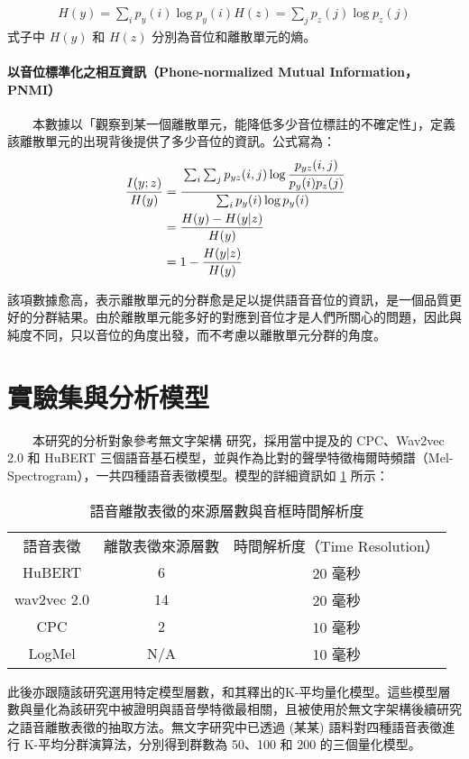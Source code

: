     \begin{align}
        H(y) = \sum_i{p_y(i)\log p_y(i)}
        H(z) = \sum_j{p_z(j)\log p_z(j)}
    \end{align}
式子中 $H(y)$ 和 $H(z)$ 分別為音位和離散單元的熵。

\paragraph{以音位標準化之相互資訊（Phone-normalized Mutual Information，PNMI）}

　　本數據以「觀察到某一個離散單元，能降低多少音位標註的不確定性」，定義該離散單元的出現背後提供了多少音位的資訊。公式寫為：
    \begin{align}
        \frac{I(y;z)}{H(y)}&=\cfrac{\sum_i \sum_j p_{yz}(i, j) \log \cfrac{p_{yz}(i, j)}{p_y(i)p_z(j)}}{\sum_i p_y(i) \log p_y(i)} \\
        &=\frac{H(y)-H(y|z)}{H(y)} \\
        &=1-\frac{H(y|z)}{H(y)}
    \end{align}

        該項數據愈高，表示離散單元的分群愈是足以提供語音音位的資訊，是一個品質更好的分群結果。由於離散單元能多好的對應到音位才是人們所關心的問題，因此與純度不同，只以音位的角度出發，而不考慮以離散單元分群的角度。




\section{實驗集與分析模型}

　　本研究的分析對象參考無文字架構 \cite{noauthor_textless_2021, lakhotia_generative_2021, lakhotia_generative_2021-1}  研究，採用當中提及的 CPC、Wav2vec 2.0 和 HuBERT 三個語音基石模型，並與作為比對的聲學特徵梅爾時頻譜（Mel-Spectrogram），一共四種語音表徵模型。模型的詳細資訊如 \ref{tab:model-info} 所示：

\begin{table}
    \centering
    \begin{tabular}{ccc}
         語音表徵&  離散表徵來源層數& 時間解析度（Time Resolution）\\
         HuBERT      
&  6& 20 毫秒\\
         wav2vec 2.0 
&  14& 20 毫秒\\
         CPC         
&  2& 10 毫秒\\
         LogMel      &  N/A& 10 毫秒\\
    \end{tabular}
    \caption{語音離散表徵的來源層數與音框時間解析度}
    \label{tab:model-info}
\end{table}
此後亦跟隨該研究選用特定模型層數，和其釋出的K-平均量化模型。這些模型層數與量化為該研究中被證明與語音學特徵最相關，且被使用於無文字架構後續研究之語音離散表徵的抽取方法。無文字研究中已透過 (某某) 語料對四種語音表徵進行 K-平均分群演算法，分別得到群數為 50、100 和 200 的三個量化模型。

